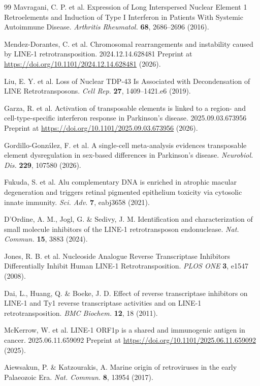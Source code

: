 \documentclass[11pt,twocolumn,twoside]{extarticle}
\begin{document}
\begin{thebibliography}{99}
 Mavragani, C. P. et al. Expression of Long Interspersed Nuclear Element 1 Retroelements and Induction of Type I Interferon in Patients With Systemic Autoimmune Disease. \textit{Arthritis Rheumatol.} \textbf{68}, 2686--2696 (2016).

 Mendez-Dorantes, C. et al. Chromosomal rearrangements and instability caused by LINE-1 retrotransposition. 2024.12.14.628481 Preprint at \url{https://doi.org/10.1101/2024.12.14.628481} (2026).

 Liu, E. Y. et al. Loss of Nuclear TDP-43 Is Associated with Decondensation of LINE Retrotransposons. \textit{Cell Rep.} \textbf{27}, 1409--1421.e6 (2019).

 Garza, R. et al. Activation of transposable elements is linked to a region- and cell-type-specific interferon response in Parkinson's disease. 2025.09.03.673956 Preprint at \url{https://doi.org/10.1101/2025.09.03.673956} (2026).

 Gordillo-Gonz\'alez, F. et al. A single-cell meta-analysis evidences transposable element dysregulation in sex-based differences in Parkinson's disease. \textit{Neurobiol. Dis.} \textbf{229}, 107580 (2026).

 Fukuda, S. et al. Alu complementary DNA is enriched in atrophic macular degeneration and triggers retinal pigmented epithelium toxicity via cytosolic innate immunity. \textit{Sci. Adv.} \textbf{7}, eabj3658 (2021).

 D'Ordine, A. M., Jogl, G. \& Sedivy, J. M. Identification and characterization of small molecule inhibitors of the LINE-1 retrotransposon endonuclease. \textit{Nat. Commun.} \textbf{15}, 3883 (2024).

 Jones, R. B. et al. Nucleoside Analogue Reverse Transcriptase Inhibitors Differentially Inhibit Human LINE-1 Retrotransposition. \textit{PLOS ONE} \textbf{3}, e1547 (2008).

 Dai, L., Huang, Q. \& Boeke, J. D. Effect of reverse transcriptase inhibitors on LINE-1 and Ty1 reverse transcriptase activities and on LINE-1 retrotransposition. \textit{BMC Biochem.} \textbf{12}, 18 (2011).

 McKerrow, W. et al. LINE-1 ORF1p is a shared and immunogenic antigen in cancer. 2025.06.11.659092 Preprint at \url{https://doi.org/10.1101/2025.06.11.659092} (2025).

 Aiewsakun, P. \& Katzourakis, A. Marine origin of retroviruses in the early Palaeozoic Era. \textit{Nat. Commun.} \textbf{8}, 13954 (2017).


\end{thebibliography}
\end{document}

